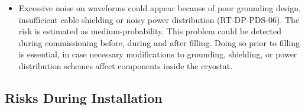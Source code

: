 \begin{itemize}
\item Excessive noise on  waveforms could appear because of poor grounding design, insufficient cable shielding or noisy power distribution (RT-DP-PDS-06). The risk is estimated as medium-probability. This problem could be detected during  commissioning before, during and after filling. Doing so prior to  filling is essential, in case necessary modifications to grounding, shielding, or power distribution  schemes affect components inside the cryostat.

\end{itemize}


\subsection{Risks During Installation}
\label{sec:dp-pds-risks_installation}


